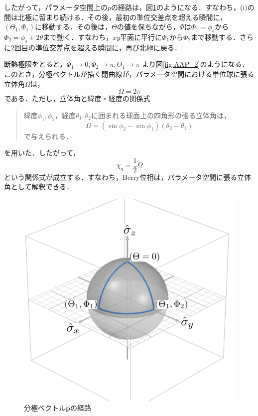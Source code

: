 \documentclass[a4paper, titlepage]{jsreport}
\begin{document}
したがって，パラメータ空間上の$p$の経路は，図\ref{fig:AAP_1}のようになる．すなわち，(i)の間は北極に留まり続ける．その後，最初の準位交差点を超える瞬間に，$(\Theta_1, \Phi_1)$に移動する．その後は，$\Theta$の値を保ちながら，$\Phi$は$\Phi_1 = \phi_s$から$\Phi_2 = \phi_s + 2\theta$まで動く．すなわち，$xy$平面に平行に$\Phi_1$から$\Phi_2$まで移動する．さらに2回目の準位交差点を超える瞬間に，再び北極に戻る．


断熱極限をとると，$\Phi_1 \rightarrow 0, \Phi_2 \rightarrow\pi, \Theta_1 \rightarrow \pi$
より図\ref{fig:AAP_2}のようになる．このとき，分極ベクトルが描く閉曲線が，パラメータ空間における単位球に張る立体角$\Omega$は，
\begin{equation}
  \Omega = 2\pi
\end{equation}
である．ただし，立体角と緯度・経度の関係式
\begin{quote}
  緯度$\phi_1, \phi_2$，経度$\theta_1, \theta_2$に囲まれる球面上の四角形の張る立体角は，
  \begin{equation}
    \Omega = (\sin \phi_2 - \sin \phi_1) (\theta_2 - \theta_1)
  \end{equation}
  で与えられる．
\end{quote}
を用いた．したがって，
\begin{equation}
  \chi_g = \frac{1}{2} \Omega \label{solidangle_g}
\end{equation}
という関係式が成立する．すなわち，Berry位相は，パラメータ空間に張る立体角として解釈できる．

\begin{figure}[htbp]
  \centering
  \includegraphics[scale=0.5]{figures/AAP_1.png}
  \caption{分極ベクトル$\bm{p}$の経路}
  \label{fig:AAP_1}
\end{figure}
\end{document}
